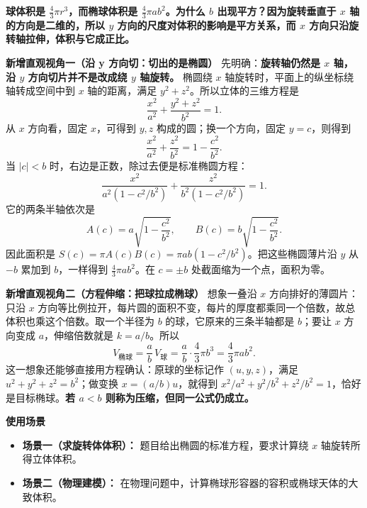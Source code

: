 \begin{explanationbox}
	\textbf{球体积是 \(\frac{4}{3}\pi r^{3}\)，而椭球体积是 \(\frac{4}{3}\pi a b^{2}\)。为什么 \(b\) 出现平方？因为旋转垂直于 \(x\) 轴的方向是二维的，所以 \(y\) 方向的尺度对体积的影响是平方关系，而 \(x\) 方向只沿旋转轴拉伸，体积与它成正比。}
	\begin{center}
		
	\end{center}
	\medskip
	\textbf{\textcolor{CExplanation}{新增直观视角一（沿 y 方向切：切出的是椭圆）}}
	先明确：\textbf{旋转轴仍然是 \(x\) 轴，沿 \(y\) 方向切片并不是改成绕 \(y\) 轴旋转。}
	椭圆绕 \(x\) 轴旋转时，平面上的纵坐标绕轴转成空间中到 \(x\) 轴的距离，满足 \(y^{2}+z^{2}\)。所以立体的三维方程是
	\[
		\frac{x^{2}}{a^{2}}+\frac{y^{2}+z^{2}}{b^{2}}=1.
	\]
	从 \(x\) 方向看，固定 \(x\)，可得到 \(y,z\) 构成的圆；换一个方向，固定 \(y=c\)，则得到
	\[
		\frac{x^{2}}{a^{2}}+\frac{z^{2}}{b^{2}}=1-\frac{c^{2}}{b^{2}}.
	\]
	当 \(|c|<b\) 时，右边是正数，除过去便是标准椭圆方程：
	\[
		\frac{x^{2}}{a^{2}(1-c^{2}/b^{2})}
		+\frac{z^{2}}{b^{2}(1-c^{2}/b^{2})}=1.
	\]
	它的两条半轴依次是
	\[
		A(c)=a\sqrt{1-\frac{c^{2}}{b^{2}}},\qquad
		B(c)=b\sqrt{1-\frac{c^{2}}{b^{2}}}.
	\]
	因此面积是 \(S(c)=\pi A(c)B(c)=\pi ab(1-c^{2}/b^{2})\)。把这些椭圆薄片沿 \(y\) 从 \(-b\) 累加到 \(b\)，一样得到 \(\frac43\pi ab^{2}\)。在 \(c=\pm b\) 处截面缩为一个点，面积为零。

	\medskip
	\textbf{\textcolor{CExplanation}{新增直观视角二（方程伸缩：把球拉成椭球）}}
	想象一叠沿 \(x\) 方向排好的薄圆片：只沿 \(x\) 方向等比例拉开，每片圆的面积不变，每片的厚度都乘同一个倍数，故总体积也乘这个倍数。取一个半径为 \(b\) 的球，它原来的三条半轴都是 \(b\)；要让 \(x\) 方向变成 \(a\)，伸缩倍数就是 \(k=a/b\)。所以
	\[
		V_{\text{椭球}}=\frac{a}{b}\,V_{\text{球}}
		=\frac{a}{b}\cdot\frac43\pi b^{3}
		=\frac43\pi ab^{2}.
	\]
	这一想象还能够直接用方程确认：原球的坐标记作 \((u,y,z)\)，满足 \(u^{2}+y^{2}+z^{2}=b^{2}\)；做变换 \(x=(a/b)u\)，就得到 \(x^{2}/a^{2}+y^{2}/b^{2}+z^{2}/b^{2}=1\)，恰好是目标椭球。\textbf{若 \(a<b\) 则称为压缩，但同一公式仍成立。}

	\medskip

	\textbf{\textcolor{CExplanation}{使用场景}}
	\begin{itemize}[leftmargin=*, itemsep=0.5em, topsep=0.4em]
		\item \textbf{场景一（求旋转体体积）：} 题目给出椭圆的标准方程，要求计算绕 \(x\) 轴旋转所得立体体积。
		\item \textbf{场景二（物理建模）：} 在物理问题中，计算椭球形容器的容积或椭球天体的大致体积。
	\end{itemize}
\end{explanationbox}
